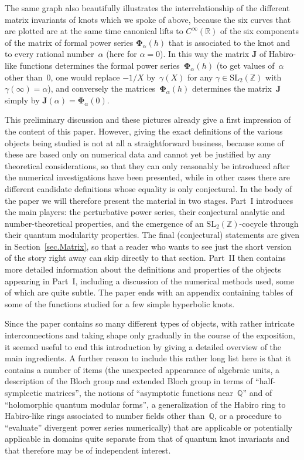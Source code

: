 \documentclass[pdftex]{sigma}
\numberwithin{equation}{section}
\def\SL{\mathrm{SL}}
\def\a{\alpha}
\def\R{\mathbb R}
\def\Z{\mathbb Z}
\def\Q{\mathbb Q}
\def\a{\alpha}
\def\g{\gamma}
\def\bJ{J} \def\bJ{\mathbf{J}}
\def\bPhi{\mathbf\Phi}
\begin{document}
The same graph also beautifully illustrates the interrelationship of the different
matrix invariants of knots which we spoke of above, because the six curves that are
plotted are at the same time canonical lifts to $C^\infty(\R)$ of the six components of
the matrix of formal power series $\bPhi_\a(h)$ that is associated to the knot and to
every rational number~$\a$ (here for $\a=0$). In this way the matrix $\bJ$ of
Habiro-like functions determines the formal power series~$\bPhi_\a(h)$ (to get values
of~$\a$ other than~0, one would replace $-1/X$ by~$\g(X)$ for any $\g\in\SL_2(\Z)$ with
$\g(\infty)=\a$), and conversely the matrices~$\bPhi_\a(h)$ determines the matrix~$\bJ$ simply by $\bJ(\a)=\bPhi_\a(0)$.

This preliminary discussion and these pictures already give a first impression of the
content of this paper. However, giving the exact definitions of the various objects
being studied is not at all a straightforward business, because some of these are
based only on numerical data and cannot yet be justified by any theoretical
considerations, so that they can only reasonably be introduced after the numerical
investigations have been presented, while in other cases there are different candidate
definitions whose equality is only conjectural. In the body of the paper we
will therefore present the material in two stages. Part~I introduces the main players:
the perturbative power series, their conjectural analytic and number-theoretical
properties, and the emergence of an $\SL_2(\Z)$-cocycle through their quantum modularity
properties. The final (conjectural) statements are given in Section~\ref{sec.Matrix},
so that a reader who wants to see just the short version of the story right away can
skip directly to that section. Part~II then contains more detailed information about
the definitions and properties of the objects appearing in Part~I, including a
discussion of the numerical methods used, some of which are quite subtle. The paper ends
with an appendix containing tables of some of the functions studied for a few simple
hyperbolic knots.

Since the paper contains so many different types of objects, with rather intricate
inter\-connections and taking shape only gradually in the course of the exposition, it
seemed useful to end this introduction by giving a detailed overview of the main
ingredients. A further reason to include this rather long list here is that it contains
a number of items (the unexpected appearance of algebraic units, a description of the
Bloch group and extended Bloch group in terms of ``half-symplectic matrices'',
the notions of ``asymptotic functions near~$\Q$'' and of ``holomorphic quantum modular
forms'', a generalization of the Habiro ring to Habiro-like rings associated to number
fields other than~$\Q$, or a procedure to ``evaluate'' divergent power series numerically)
that are applicable or potentially applicable in domains quite separate from
that of quantum knot invariants and that therefore may be of independent interest.
\end{document}
